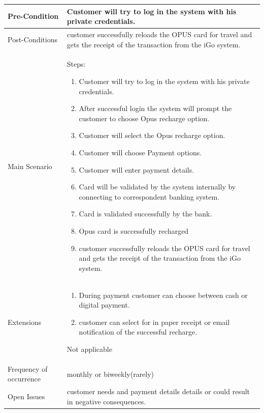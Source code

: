 \documentclass[11pt, english]{report}
\begin{document}
\setlength{\tabcolsep}{18pt}
\renewcommand{\arraystretch}{1.5}
\begin{tabular}{ |p{4cm}|p{10cm}|}
\hline
Pre-Condition & Customer will try to log in the system with his private credentials. \\
\hline
Post-Conditions & customer successfully reloads the OPUS card for travel and gets the receipt of the transaction from the iGo system.\\
\hline
Main Scenario & Steps:
\begin{enumerate}
  \item Customer will try to log in the system with his private credentials.
  \item After successful login the system will prompt the customer to choose Opus recharge option.
  \item Customer will select the Opus recharge option.
  \item Customer will choose Payment options.
  \item Customer will enter payment details.
  \item Card will be validated by the system internally by connecting to correspondent banking system.
  \item  Card is validated successfully by the bank.
  \item Opus card is successfully recharged
  \item customer successfully reloads the OPUS card for travel and gets the receipt of the transaction from the iGo system.
  
\end{enumerate}

\\
\hline
Extensions &
\begin{enumerate}
  \item During payment customer can choose between cash or digital payment.
  \item customer can select for in paper receipt or email notification of the successful recharge.
  
\end{enumerate}


Not applicable\\
\hline
Frequency of occurrence &
monthly or biweekly(rarely)\\

\hline
Open Issues & customer needs and payment details details or could result in negative consequences.\\
\hline
\end{tabular}
\end{document}
